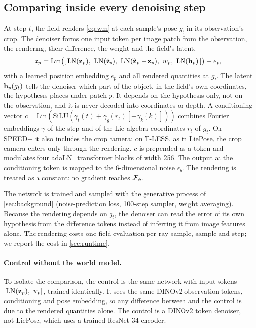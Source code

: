 \subsection{Comparing inside every denoising step}
\label{sec:den}
At step $t$, the field renders \cref{eq:wm} at each sample's pose $g_t$ in its observation's crop. The denoiser forms one input token
per image patch from the observation, the rendering, their difference, the weight and the field's latent,
\begin{equation}
x_p=\mathrm{Lin}\big([\,\mathrm{LN}(\zobs_p),\ \mathrm{LN}(\zhat_p),\ \mathrm{LN}(\zhat_p-\zobs_p),\ w_p,\ \mathrm{LN}(\hlat_p)\,]\big)+e_p,
\label{eq:tokens}
\end{equation}
with a learned position embedding $e_p$ and all rendered quantities at $g_t$. The latent $\mathbf{h}_p(g_t)$ tells the denoiser which part of
the object, in the field's own coordinates, the hypothesis places under patch $p$. It depends on the hypothesis only, not on the
observation, and it is never decoded into coordinates or depth. A conditioning vector $c=\mathrm{Lin}(\mathrm{SiLU}(\gamma_t(t)+\gamma_g(r_t)
[+\gamma_k(k)]))$ combines Fourier embeddings $\gamma$ of the step and of the Lie-algebra coordinates $r_t$ of $g_t$. On SPEED+ it also
includes the crop camera; on T-LESS, as in LiePose, the crop camera enters only through the rendering. $c$ is prepended as a token and
modulates four adaLN~\cite{peebles2023dit} transformer blocks of width 256. The output at the conditioning token is mapped to the
6-dimensional noise $\epsilon_\theta$. The rendering is treated as a constant: no gradient reaches $\mathcal{F}_\phi$.

The network is trained and sampled with the generative process of \cref{sec:background} (noise-prediction loss, 100-step sampler,
weight averaging). Because the rendering depends on $g_t$, the denoiser can read the error of its own hypothesis from the difference
tokens instead of inferring it from image features alone. The rendering costs one field evaluation per ray sample, sample and step; we
report the cost in \cref{sec:runtime}.

\paragraph{Control without the world model.}
To isolate the comparison, the control is the same network with input tokens $[\mathrm{LN}(\mathbf{z}_p),\ w_p]$, trained identically. It
sees the same DINOv2 observation tokens, conditioning and pose embedding, so any difference between \method and the control is due to
the rendered quantities alone. The control is a DINOv2 token denoiser, not LiePose, which uses a trained ResNet-34 encoder.

